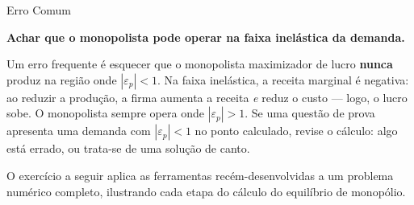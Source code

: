 \documentclass[11pt,twoside,openright]{book}
\begin{document}
\begin{warningbox}{Erro Comum}

\textbf{Achar que o monopolista pode operar na faixa inelástica da
demanda.}

Um erro frequente é esquecer que o monopolista maximizador de lucro
\textbf{nunca} produz na região onde \(|\varepsilon_p| < 1\). Na faixa
inelástica, a receita marginal é negativa: ao reduzir a produção, a
firma aumenta a receita \emph{e} reduz o custo --- logo, o lucro sobe. O
monopolista sempre opera onde \(|\varepsilon_p| > 1\). Se uma questão de
prova apresenta uma demanda com \(|\varepsilon_p| < 1\) no ponto
calculado, revise o cálculo: algo está errado, ou trata-se de uma
solução de canto.

\end{warningbox}

O exercício a seguir aplica as ferramentas recém-desenvolvidas a um
problema numérico completo, ilustrando cada etapa do cálculo do
equilíbrio de monopólio.
\end{document}
